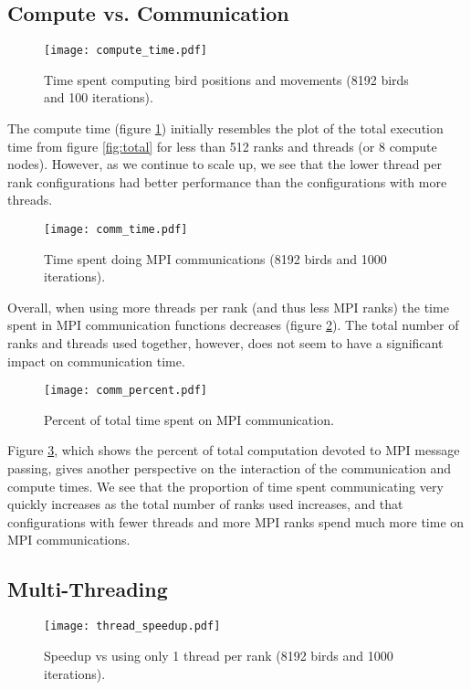 \subsection*{Compute vs. Communication}

\begin{figure}[h!]
  \centering
  \texttt{[image: compute\_time.pdf]}
  \caption{Time spent computing bird positions and movements (8192 birds and 100 iterations).\label{fig:compute}}
\end{figure}

The compute time (figure \ref{fig:compute}) initially resembles the plot of the total
execution time from figure \ref{fig:total} for less than 512 ranks and threads (or
8 compute nodes). However, as we continue to scale up, we see that the lower
thread per rank configurations had better performance than the configurations
with more threads.

\begin{figure}[h!]
  \centering
  \texttt{[image: comm\_time.pdf]}
  \caption{Time spent doing MPI communications (8192 birds and 1000 iterations).\label{fig:comm}}
\end{figure}

Overall, when using more threads per rank (and thus less MPI ranks) the time
spent in MPI communication functions decreases (figure \ref{fig:comm}). The total
number of ranks and threads used together, however, does not seem to have a
significant impact on communication time.

\begin{figure}[h!]
  \centering
  \texttt{[image: comm\_percent.pdf]}
  \caption{Percent of total time spent on MPI communication.\label{fig:commpercent}}
\end{figure}

Figure \ref{fig:commpercent}, which shows the percent of total computation
devoted to MPI message passing, gives another perspective on the interaction of the
communication and compute times. We see that the proportion of time spent
communicating very quickly increases as the total number of ranks used increases,
and that configurations with fewer threads and more MPI ranks spend much more time
on MPI communications.

\subsection*{Multi-Threading}
\FloatBarrier
\begin{figure}[h!]
  \centering
  \texttt{[image: thread\_speedup.pdf]}
  \caption{Speedup vs using only 1 thread per rank (8192 birds and 1000 iterations).\label{fig:threads}}
\end{figure}

